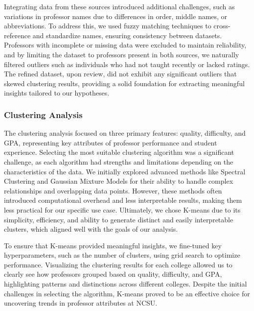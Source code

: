 \documentclass[sigconf,nonacm]{acmart}
\begin{document}
Integrating data from these sources introduced additional challenges, such as variations in professor names due to differences in order, middle names, or abbreviations. To address this, we used fuzzy matching techniques to cross-reference and standardize names, ensuring consistency between datasets. Professors with incomplete or missing data were excluded to maintain reliability, and by limiting the dataset to professors present in both sources, we naturally filtered outliers such as individuals who had not taught recently or lacked ratings. The refined dataset, upon review, did not exhibit any significant outliers that skewed clustering results, providing a solid foundation for extracting meaningful insights tailored to our hypotheses.

\subsubsection{Clustering Analysis}
The clustering analysis focused on three primary features: quality, difficulty, and GPA, representing key attributes of professor performance and student experience. Selecting the most suitable clustering algorithm was a significant challenge, as each algorithm had strengths and limitations depending on the characteristics of the data. We initially explored advanced methods like Spectral Clustering and Gaussian Mixture Models for their ability to handle complex relationships and overlapping data points. However, these methods often introduced computational overhead and less interpretable results, making them less practical for our specific use case. Ultimately, we chose K-means due to its simplicity, efficiency, and ability to generate distinct and easily interpretable clusters, which aligned well with the goals of our analysis.

To ensure that K-means provided meaningful insights, we fine-tuned key hyperparameters, such as the number of clusters, using grid search to optimize performance. Visualizing the clustering results for each college allowed us to clearly see how professors grouped based on quality, difficulty, and GPA, highlighting patterns and distinctions across different colleges. Despite the initial challenges in selecting the algorithm, K-means proved to be an effective choice for uncovering trends in professor attributes at NCSU.
\end{document}

